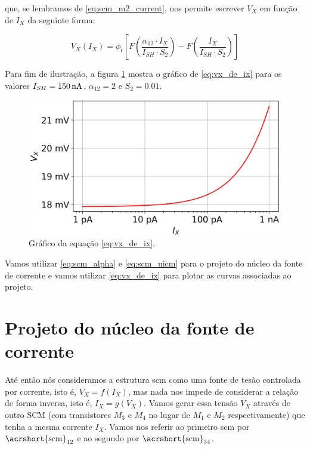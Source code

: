 \documentclass[10pt,a4paper]{extreport}
\newcommand{\?}{\stackrel{?}{=}}
\newcommand{\sis}[2]{\complexnum{#1}\,\si[per-mode=symbol]{#2}}
\newcommand{\mysize}{0.69}
\begin{document}
\noindent que, se lembramos de \eqref{eq:scm_m2_current}, nos permite escrever $V_X$ em função de $I_X$ da seguinte forma:

\begin{equation}
    \label{eq:vx_de_ix}
    V_X(I_X)=\phi_t\left[F\left(\frac{\alpha_{12}\cdot I_X}{I_{SH}\cdot S_2}\right)-F\left(\frac{I_X}{I_{SH}\cdot S_2}\right)\right]
\end{equation}

Para fim de ilustração, a figura \ref{fig:scm_single_plot} mostra o gráfico de \eqref{eq:vx_de_ix} para os valores $I_{SH}=\sis{150}{\nano\ampere}$, $\alpha_{12}=2$ e $S_2=\num{0.01}$.

\begin{figure}[htp!]
    \includegraphics[width=\mysize\linewidth]{Imagens/scm_single_plot.png}
    \centering
    \caption{Gráfico da equação \eqref{eq:vx_de_ix}.}
    \label{fig:scm_single_plot}
\end{figure}

Vamos utilizar \eqref{eq:scm_alpha} e \eqref{eq:scm_uicm} para o projeto do núcleo da fonte de corrente e vamos utilizar \eqref{eq:vx_de_ix} para plotar as curvas associadas ao projeto.

\section{Projeto do núcleo da fonte de corrente}

Até então nós consideramos a estrutura \acrshort{scm} como uma fonte de tesão controlada por corrente, isto é, $V_X=f(I_X)$, mas nada nos impede de considerar a relação de forma inversa, isto é, $I_X=g(V_X)$. Vamos gerar essa tensão $V_X$ através de outro SCM (com transistores $M_3$ e $M_4$ no lugar de $M_1$ e $M_2$ respectivamente) que tenha a mesma corrente $I_X$. Vamos nos referir ao primeiro \acrshort{scm} por $\text{\acrshort{scm}}_{12}$ e ao segundo por $\text{\acrshort{scm}}_{34}$.
\end{document}
